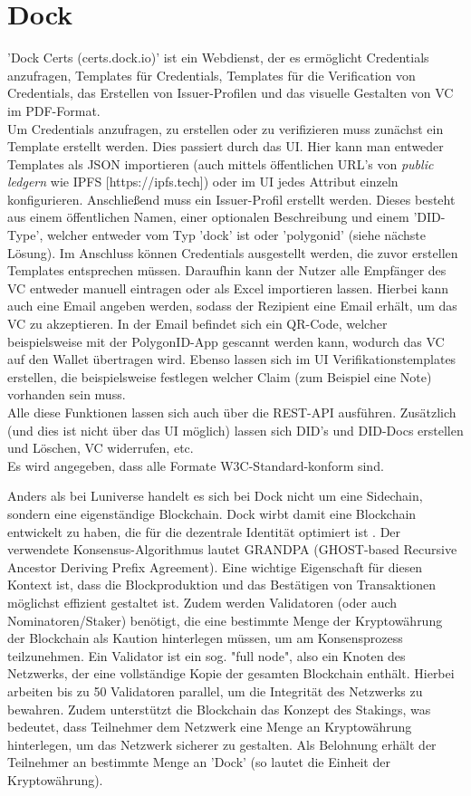 \section{Dock}
'Dock Certs (certs.dock.io)' ist ein Webdienst, der es ermöglicht Credentials anzufragen, Templates für Credentials, Templates für die Verification von Credentials, das Erstellen von Issuer-Profilen und das visuelle Gestalten von VC im PDF-Format.\\
Um Credentials anzufragen, zu erstellen oder zu verifizieren muss zunächst ein Template erstellt werden. Dies passiert durch das UI. Hier kann man entweder Templates als JSON importieren (auch mittels öffentlichen URL's von \textsl{public ledgern} wie IPFS [https://ipfs.tech]) oder im UI jedes Attribut einzeln konfigurieren. Anschließend muss ein Issuer-Profil erstellt werden. Dieses besteht aus einem öffentlichen Namen, einer optionalen Beschreibung und einem 'DID-Type', welcher entweder vom Typ 'dock' ist oder 'polygonid' (siehe nächste Lösung).
Im Anschluss können Credentials ausgestellt werden, die zuvor erstellen Templates entsprechen müssen. Daraufhin kann der Nutzer alle Empfänger des VC entweder manuell eintragen oder als Excel importieren lassen. Hierbei kann auch eine Email angeben werden, sodass der Rezipient eine Email erhält, um das VC zu akzeptieren. In der Email befindet sich ein QR-Code, welcher beispielsweise mit der PolygonID-App gescannt werden kann, wodurch das VC auf den Wallet übertragen wird.
Ebenso lassen sich im UI Verifikationstemplates erstellen, die beispielsweise festlegen welcher Claim (zum Beispiel eine Note) vorhanden sein muss.\\
Alle diese Funktionen lassen sich auch über die REST-API ausführen. Zusätzlich (und dies ist nicht über das UI möglich) lassen sich DID's und DID-Docs erstellen und Löschen, VC widerrufen, etc. \\
Es wird angegeben, dass alle Formate W3C-Standard-konform sind.

Anders als bei Luniverse handelt es sich bei Dock nicht um eine Sidechain, sondern eine eigenständige Blockchain. Dock wirbt damit eine Blockchain entwickelt zu haben, die für die dezentrale Identität optimiert ist \cite{ID30}. Der verwendete Konsensus-Algorithmus lautet GRANDPA (GHOST-based Recursive Ancestor Deriving Prefix Agreement). Eine wichtige Eigenschaft für diesen Kontext ist, dass die Blockproduktion und das Bestätigen von Transaktionen möglichst effizient gestaltet ist. Zudem werden Validatoren (oder auch Nominatoren/Staker) benötigt, die eine bestimmte Menge der Kryptowährung der Blockchain als Kaution hinterlegen müssen, um am Konsensprozess teilzunehmen. Ein Validator ist ein sog. "full node", also ein Knoten des Netzwerks, der eine vollständige Kopie der gesamten Blockchain enthält. Hierbei arbeiten bis zu 50 Validatoren parallel, um die Integrität des Netzwerks zu bewahren. Zudem unterstützt die Blockchain das Konzept des Stakings, was bedeutet, dass Teilnehmer dem Netzwerk eine Menge an Kryptowährung hinterlegen, um das Netzwerk sicherer zu gestalten. Als Belohnung erhält der Teilnehmer an bestimmte Menge an 'Dock' (so lautet die Einheit der Kryptowährung).


